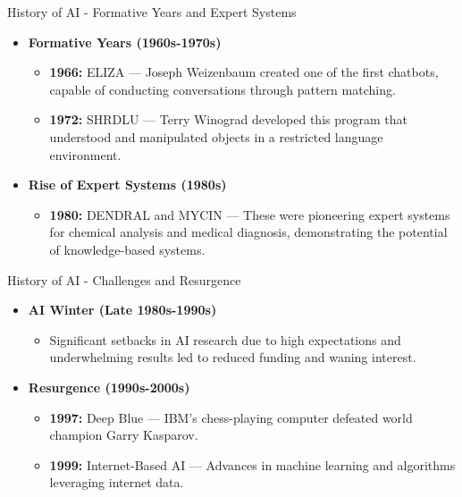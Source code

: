 \documentclass[aspectratio=169]{beamer}
\begin{document}
\begin{frame}[fragile]{History of AI - Formative Years and Expert Systems}
    \begin{itemize}
        \item \textbf{Formative Years (1960s-1970s)}
            \begin{itemize}
                \item \textbf{1966:} ELIZA — Joseph Weizenbaum created one of the first chatbots, capable of conducting conversations through pattern matching.
                \item \textbf{1972:} SHRDLU — Terry Winograd developed this program that understood and manipulated objects in a restricted language environment.
            \end{itemize}
        
        \item \textbf{Rise of Expert Systems (1980s)}
            \begin{itemize}
                \item \textbf{1980:} DENDRAL and MYCIN — These were pioneering expert systems for chemical analysis and medical diagnosis, demonstrating the potential of knowledge-based systems.
            \end{itemize}
    \end{itemize}
\end{frame}

\begin{frame}[fragile]{History of AI - Challenges and Resurgence}
    \begin{itemize}
        \item \textbf{AI Winter (Late 1980s-1990s)}
            \begin{itemize}
                \item Significant setbacks in AI research due to high expectations and underwhelming results led to reduced funding and waning interest.
            \end{itemize}
        
        \item \textbf{Resurgence (1990s-2000s)}
            \begin{itemize}
                \item \textbf{1997:} Deep Blue — IBM's chess-playing computer defeated world champion Garry Kasparov.
                \item \textbf{1999:} Internet-Based AI — Advances in machine learning and algorithms leveraging internet data.
            \end{itemize}
    \end{itemize}
\end{frame}
\end{document}
